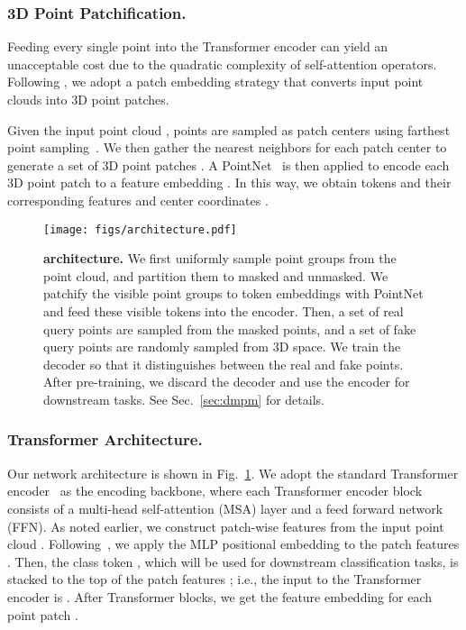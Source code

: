 \documentclass[runningheads]{llncs}
\begin{document}
\vspace{-10pt}
\subsubsection{3D Point Patchification.}
\label{Point Patchify}
Feeding every single point into the Transformer encoder can yield an unacceptable cost due to the quadratic complexity of self-attention operators.  Following \cite{yu2021point,dosovitskiy2020vit}, we adopt a patch embedding strategy that converts input point clouds into 3D point patches.

Given the input point cloud ,  points  are sampled as patch centers using farthest point sampling~\cite{qi2017pointnetplusplus}.  We then gather the  nearest neighbors for each patch center to generate a set of 3D point patches .  A PointNet~\cite{qi2017pointnet} is then applied to encode each 3D point patch  to a feature embedding .  In this way, we obtain  tokens and their corresponding features  and center coordinates .

\begin{figure}[t]
    \centering
    \texttt{[image: figs/architecture.pdf]}
    \caption{\textbf{\methodname{} architecture.} We first uniformly sample point groups from the point cloud, and partition them to masked and unmasked.  We patchify the visible point groups to token embeddings with PointNet and feed these visible tokens into the encoder.  Then, a set of real query points are sampled from the masked points, and a set of fake query points are randomly sampled from 3D space.  We train the decoder so that it distinguishes between the real and fake points. After pre-training, we discard the decoder and use the encoder for downstream tasks. See Sec.~\ref{sec:dmpm} for details.}
    \label{fig:architecture}
\end{figure}

\vspace{-10pt}
\subsubsection{Transformer Architecture.}
Our network architecture is shown in Fig.~\ref{fig:architecture}. We adopt the standard Transformer encoder~\cite{NIPS2017_3f5ee243} as the encoding  backbone, where each Transformer encoder block consists of a multi-head self-attention (MSA) layer and a feed forward network (FFN). 
As noted earlier, we construct patch-wise features  from the input point cloud .  Following~\cite{yu2021point}, we apply the MLP positional embedding   to  the patch features . Then, the class token , which will be used for downstream classification tasks, is stacked to the top of the patch features ;
i.e., the input to the Transformer encoder is . After  Transformer blocks, we get the feature embedding for each point patch . 
\end{document}
